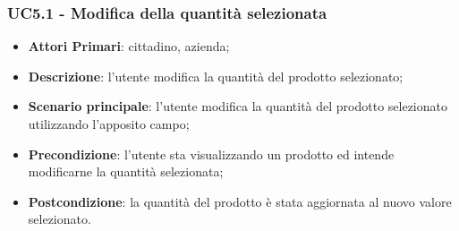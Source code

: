  \subsubsection{UC5.1 - Modifica della quantità selezionata}
 \begin{itemize}
 	\item \textbf{Attori Primari}: cittadino, azienda\glo;
 	\item \textbf{Descrizione}: l'utente modifica la quantità del prodotto selezionato;
 	\item \textbf{Scenario principale}: l'utente modifica la quantità del prodotto selezionato utilizzando l'apposito campo;
 	\item \textbf{Precondizione}: l'utente sta visualizzando un prodotto ed intende modificarne la quantità selezionata;
 	\item \textbf{Postcondizione}: la quantità del prodotto è stata aggiornata al nuovo valore selezionato.
 \end{itemize}